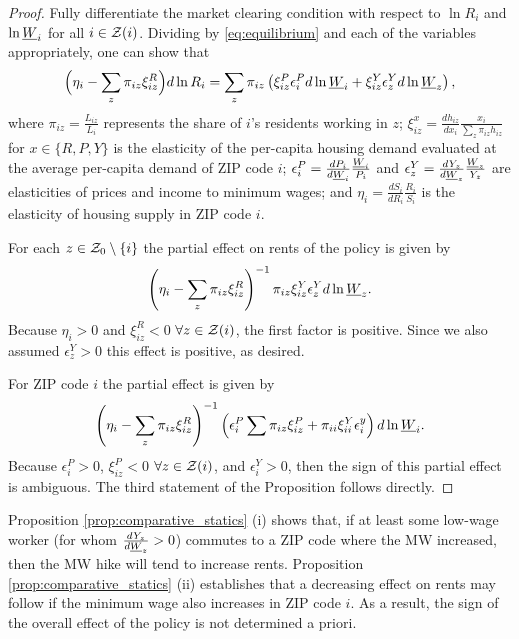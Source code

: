 \begin{proof}
    Fully differentiate the market clearing condition with respect to $\ln R_i$ 
    and $\ln \underline{W}_i$ for all $i\in\mathcal{Z}(i)$.
    Dividing by \eqref{eq:equilibrium} and each of the variables appropriately, 
    one can show that
    \begin{equation}\label{eq:diff_equilibrium}
        \Big(\eta_i - \sum_z \pi_{iz} \xi^R_{iz} \Big) d \ln R_i
        = 
        \sum_z \pi_{iz} \left(\xi^P_{iz} \epsilon_{i}^P d \ln \underline{W}_i 
                            + \xi^Y_{iz} \epsilon_{z}^Y d \ln \underline{W}_z \right) ,
    \end{equation}
    where
    $\pi_{iz} = \frac{L_{iz}}{L_i}$ represents the share of $i$'s residents 
    working in $z$;
    $\xi_{iz}^x = \frac{d h_{iz}}{d x_i} \frac{x_i}{\sum_z \pi_{iz} h_{iz}}$ for
    $x\in\{R,P,Y\}$ is the elasticity of the per-capita housing demand evaluated 
    at the average per-capita demand of ZIP code $i$;
    $\epsilon_{i}^P = \frac{d P_i}{d \underline{W}_i} \frac{\underline{W}_i}{P_i}$ and 
    $\epsilon_{z}^Y = \frac{d Y_z}{d \underline{W}_z} \frac{\underline{W}_z}{Y_z}$ are
    elasticities of prices and income to minimum wages; and
    $\eta_i = \frac{d S_i}{d R_i} \frac{R_i}{S_i}$ is the elasticity 
    of housing supply in ZIP code $i$.

    For each $z\in\mathcal{Z}_0\setminus\{i\}$ the partial effect on rents of the policy
    is given by 
    $$\left(\eta_i - \sum_z \pi_{iz} \xi^R_{iz}\right)^{-1} 
      \pi_{iz}\xi^Y_{iz}\epsilon_{z}^Y d\ln\underline{W}_z.$$
    Because $\eta_i>0$ and $\xi^R_{iz} < 0$  $\forall z\in\mathcal{Z}(i)$, 
    the first factor is positive.
    Since we also assumed $\epsilon_{z}^Y>0$ this effect is positive, as 
    desired.

    For ZIP code $i$ the partial effect is given by
    $$\left(\eta_i - \sum_z \pi_{iz} \xi^R_{iz}\right)^{-1} 
      \left(\epsilon_{i}^P \sum \pi_{iz}\xi^P_{iz} 
            + \pi_{ii}\xi^Y_{ii}\epsilon_i^y \right)d\ln\underline{W}_i.$$
    Because $\epsilon_{i}^P>0$, $\xi^P_{iz}<0$ $\forall z\in\mathcal{Z}(i)$,
    and $\epsilon_{i}^Y>0$, 
    then the sign of this partial effect is ambiguous.
    The third statement of the Proposition follows directly.
\end{proof}

Proposition \ref{prop:comparative_statics} (i) shows that,
if at least some low-wage worker (for whom $\frac{d Y_z}{d \underline{W}_z}>0$)
commutes to a ZIP code where the MW increased,
then the MW hike will tend to increase rents.
Proposition \ref{prop:comparative_statics} (ii) establishes that a decreasing
effect on rents may follow if the minimum wage also increases in ZIP code $i$.
As a result, the sign of the overall effect of the policy is not determined a 
priori.

